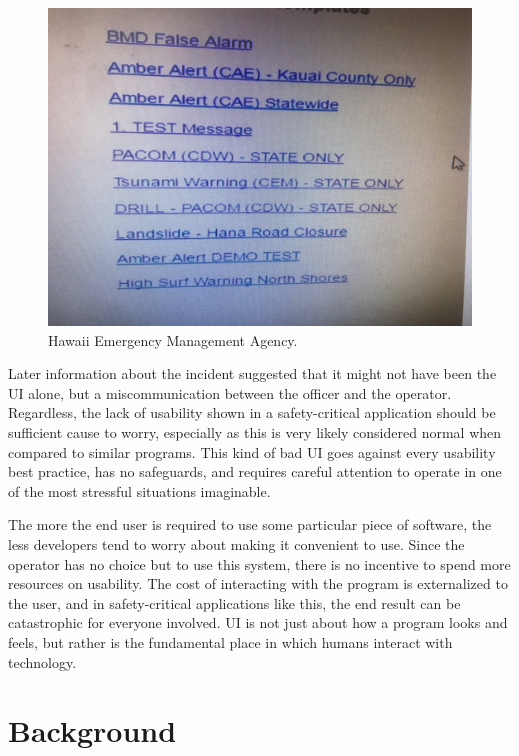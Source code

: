\documentclass[12pt, oneside]{article}
\begin{document}
\begin{figure}
  \includegraphics[width=\linewidth]{Resources/alert.jpg}
  \caption{Hawaii Emergency Management Agency.}
  \label{fig:alert}
\end{figure}

Later information about the incident suggested that it might not have been the UI alone, but a miscommunication between the officer and the operator. Regardless, the lack of usability shown in a safety-critical application should be sufficient cause to worry, especially as this is very likely considered normal when compared to similar programs. This kind of bad UI goes against every usability best practice, has no safeguards, and requires careful attention to operate in one of the most stressful situations imaginable.

The more the end user is required to use some particular piece of software, the less developers tend to worry about making it convenient to use. Since the operator has no choice but to use this system, there is no incentive to spend more resources on usability. The cost of interacting with the program is externalized to the user, and in safety-critical applications like this, the end result can be catastrophic for everyone involved. UI is not just about how a program looks and feels, but rather is the fundamental place in which humans interact with technology.

\section{Background}
\end{document}
